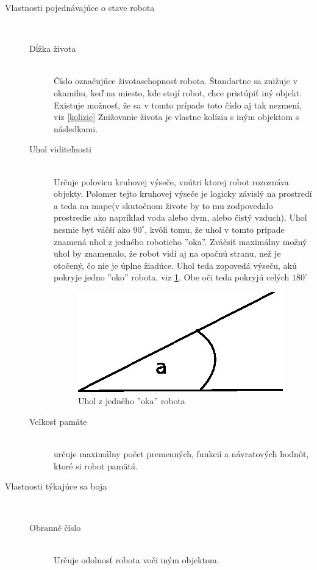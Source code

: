 \begin{description}
\item [Vlastnosti pojednávajúce o stave robota] \hfill \\
\begin{description} 
\item [Dĺžka života] \hfill \\ Číslo označujúce životaschopnosť robota. Štandartne sa znižuje v okamihu, keď na miesto, kde stojí robot, chce pristúpiť iný objekt. Existuje možnosť, že sa v tomto prípade toto číslo aj tak nezmení, viz \ref{kolizie} Znižovanie života je vlastne kolízia s iným objektom s následkami.
\item [Uhol viditeľnosti]\hfill \\ Určuje polovicu kruhovej výseče, vnútri ktorej robot rozoznáva objekty. Polomer tejto kruhovej výseče je logicky závislý na prostredí a teda na mape(v skutočnom živote by to mu zodpovedalo prostredie ako napríklad voda alebo dym, alebo čistý vzduch). Uhol nesmie byť väčší ako $90^\circ$, kvôli tomu, že uhol v tomto prípade znamená uhol z jedného robotieho ''oka''. Zväčsiť maximálny možný uhol by znamenalo, že robot vidí aj na opačnú stranu, než je otočený, čo nie je úplne žiadúce. Uhol teda zopovedá výseču, akú pokryje jedno ''oko'' robota, viz \ref{uhol}. Obe oči teda pokryjú celých $180^\circ$
\begin {figure}
\centering
\includegraphics{angle}
\caption { Uhol z jedného ''oka'' robota }
\label{uhol}
\end {figure}
\item [Veľkosť pamäte]\hfill \\ určuje maximálny počet premenných, funkcií a návratových hodnôt, ktoré si robot pamätá. 
\end{description}
\item [Vlastnosti týkajúce sa boja]\hfill \\
\begin{description}
\item [Obranné číslo]\hfill \\ Určuje odolnosť robota voči iným objektom.

\end{description}
\end{description}
